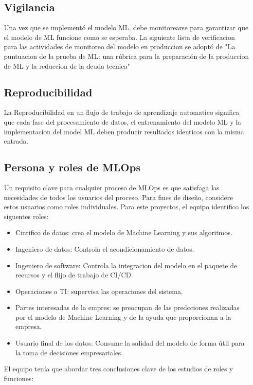 \documentclass[twoside,twocolumn]{article}
\begin{document}
\subsection{Vigilancia}
Una vez que se implementó el modelo ML, debe monitorearse para garantizar que el modelo de ML funcione como se esperaba. La siguiente lista de verificacion para las actividades de monitoreo del modelo en produccion se adoptó de 
"La puntuacion de la prueba de ML: una rúbrica para la preparación de la produccion de ML y la reduccion de la deuda tecnica"

\subsection{Reproducibilidad}
La Reproducibilidad en un flujo de trabajo de aprendizaje automatico significa que cada fase del procesamiento de datos,
el entrenamiento del modelo ML y la implementacion del model ML deben producir resultados identicos con la misma entrada.

\subsection{Persona y roles de MLOps}
Un requisito clave para cualquier proceso de MLOps es que satisfaga las necesidades de todos los usuarios del proceso. Para fines de diseño, considere estos usuarios como roles individuales. Para este proyectos,
el equipo identifico los siguentes roles:
\begin{itemize}
    \item Cintifico de datos: crea el modelo de Machine Learning y sus algoritmos.
    \item Ingeniero de datos: Controla el acondicionamiento de datos.
    \item Ingeniero de software: Controla la integracion del modelo en el paquete de recursos y el flijo de trabajo de CI/CD.
    \item Operaciones o TI: supervisa las operaciones del sistema.
    \item Partes interesadas de la empres: se preocupan de las predcciones realizadas por el modelo de Machine Learning y de la ayuda que proporcionan a la empresa.
    \item Usuario final de los datos: Consume la salidad del modelo de forma útil para la toma de decisiones empresariales.  
\end{itemize}
El equipo tenía que abordar tres conclusiones clave de los estudios de roles y funciones:
\end{document}
